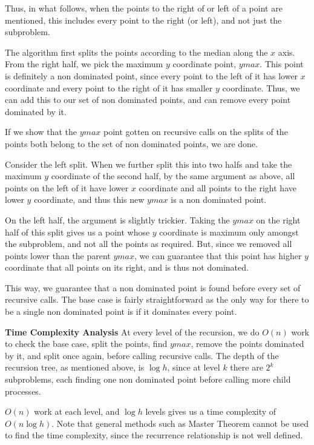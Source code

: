 \documentclass{article}
\begin{document}
Thus, in what follows, when the points to the right of or left of a point are mentioned, this includes every point to the right (or left), and not just the subproblem.
\par
The algorithm first splits the points according to the median along the $x$ axis.
From the right half, we pick the maximum $y$ coordinate point, $ymax$.
This point is definitely a non dominated point, since every point to the left of it has lower $x$ coordinate and every point to the right of it has smaller $y$ coordinate.
Thus, we can add this to our set of non dominated points, and can remove every point dominated by it.
\par
If we show that the $ymax$ point gotten on recursive calls on the splits of the points both belong to the set of non dominated points, we are done.
\par
Consider the left split.
When we further split this into two halfs and take the maximum $y$ coordinate of the second half, by the same argument as above, all points on the left of it have lower $x$ coordinate and all points to the right have lower $y$ coordinate, and thus this new $ymax$ is a non dominated point.
\par
On the left half, the argument is slightly trickier.
Taking the $ymax$ on the right half of this split gives us a point whose $y$ coordinate is maximum only amongst the subproblem, and not all the points as required.
But, since we removed all points lower than the parent $ymax$, we can guarantee that this point has higher $y$ coordinate that all points on its right, and is thus not dominated.
\par
This way, we guarantee that a non dominated point is found before every set of recursive calls. The base case is fairly straightforward as the only way for there to be a single non dominated point is if it dominates every point.
\par
\textbf{Time Complexity Analysis}
At every level of the recursion, we do $O(n)$ work to check the base case, split the points, find $ymax$, remove the points dominated by it, and split once again, before calling recursive calls.
The depth of the recursion tree, as mentioned above, is $\log{h}$, since at level $k$ there are $2^{k}$ subproblems, each finding one non dominated point before calling more child processes.
\par
$O(n)$ work at each level, and $\log{h}$ levels gives us a time complexity of $O(n \log{h})$.
Note that general methods such as Master Theorem cannot be used to find the time complexity, since the recurrence relationship is not well defined.
\par
\end{document}

